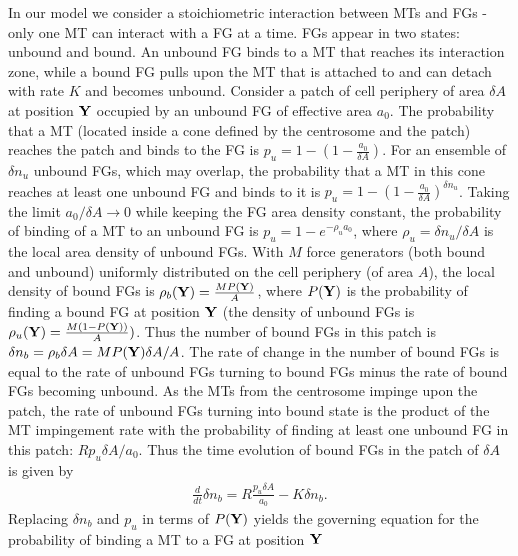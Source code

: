 \documentclass[11pt]{article}
\begin{document}
In our model we consider a stoichiometric interaction between MTs and FGs - only one MT can interact with a FG at a time. 
FGs appear in two states: unbound and bound.
An unbound FG  binds to a MT that reaches its interaction zone, while a bound FG pulls upon the MT that is attached to and can detach with rate $K$ and becomes unbound. Consider a patch of cell periphery  of area $\delta A$ at position ${\bf Y}$ occupied by an unbound FG of effective area $a_0$.  The probability that a MT (located inside a cone defined by the centrosome and the patch) reaches the patch and binds to the FG is $p_u = 1-\left(1-\frac{a_0}{\delta A}\right)$. For an ensemble of $\delta n_u$ unbound FGs, which may overlap, the probability that a MT in this cone reaches at least one unbound FG and binds to it is $p_u = 1-\left(1-\frac{a_0}{\delta A}\right)^{\delta n_u}$. Taking the limit $a_0/\delta A\rightarrow 0$ while keeping the FG area density constant, the probability of binding of a MT to an unbound FG is $p_u = 1-e^{-\rho_u a_0}$, where $\rho_u = \delta n_u/\delta A$ is the local area density of unbound FGs.
With $M$ force generators (both bound and unbound) uniformly distributed on the cell periphery (of area $A$), 
the local density of bound FGs is $\rho_b({\bf Y}) = \frac{MP({\bf Y})}{A}$, where $P({\bf Y})$ is the probability of finding a bound FG at position ${\bf Y}$ (the density of unbound FGs is $\rho_u({\bf Y})=\frac{M(1- P({\bf Y}))}{A})$.
Thus the number of bound FGs in this patch is $\delta n_b = \rho_b \delta A = M P({\bf Y}) \delta A/A$.
%
The rate of change in the number of bound FGs is equal to the rate of unbound FGs turning to bound FGs minus the rate of bound FGs becoming unbound. 
%
%
%
As the MTs from the centrosome impinge upon the patch, the rate of unbound FGs turning into bound state is the product of the MT impingement rate with the probability of finding at least one unbound FG in this patch: $R p_u \delta A/a_0$. 
Thus the time evolution of bound FGs in the patch of $\delta A$ is given by
\begin{align}
    \frac{d}{dt}\delta n_b = R \frac{p_u\delta A}{a_0} - K \delta n_b.
\end{align}
%
Replacing $\delta n_b$ and $p_u$ in terms of $P({\bf Y})$ yields the governing equation for 
the probability of binding a MT to a FG at position ${\bf Y}$ 
\end{document}
